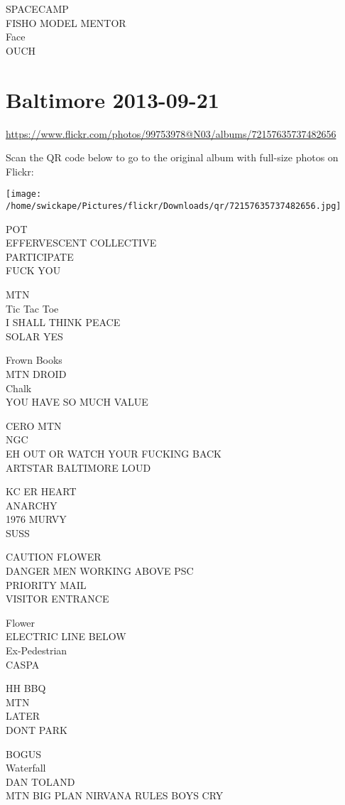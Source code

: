 \documentclass[10pt,letterpaper]{article}
\begin{document}
SPACECAMP\\
FISHO MODEL MENTOR\\
Face\\
OUCH


\section*{Baltimore 2013-09-21}

\url{https://www.flickr.com/photos/99753978@N03/albums/72157635737482656}

Scan the QR code below to go to the original album with full-size photos on Flickr:

\texttt{[image: /home/swickape/Pictures/flickr/Downloads/qr/72157635737482656.jpg]}


POT\\
EFFERVESCENT COLLECTIVE\\
PARTICIPATE\\
FUCK YOU

MTN\\
Tic Tac Toe\\
I SHALL THINK PEACE\\
SOLAR YES

Frown Books\\
MTN DROID\\
Chalk\\
YOU HAVE SO MUCH VALUE

CERO MTN\\
NGC\\
EH OUT OR WATCH YOUR FUCKING BACK\\
ARTSTAR BALTIMORE LOUD

KC ER HEART\\
ANARCHY\\
1976 MURVY\\
SUSS

CAUTION FLOWER\\
DANGER MEN WORKING ABOVE PSC\\
PRIORITY MAIL\\
VISITOR ENTRANCE

Flower\\
ELECTRIC LINE BELOW\\
Ex{-}Pedestrian\\
CASPA

HH BBQ\\
MTN\\
LATER\\
DONT PARK

BOGUS\\
Waterfall\\
DAN TOLAND\\
MTN BIG PLAN NIRVANA RULES BOYS CRY
\end{document}
